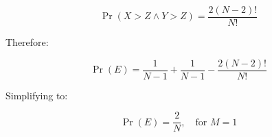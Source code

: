 \documentclass{article}
\theoremstyle{definition}
\begin{document}
\begin{appendices}
\begin{equation}
    \Pr(X>Z \wedge Y>Z)
    =
    \frac{2 (N-2)!}{N!}
\end{equation}

Therefore:

\begin{equation}
    \Pr(E) = \frac{1}{N-1} + \frac{1}{N-1} - \frac{2 (N-2)!}{N!}
\end{equation}

Simplifying to:

\begin{equation}
\boxed{
    \Pr(E) = \frac{2}{N}, \quad \text{for } M=1
    }
\end{equation}

\end{appendices}

\printbibliography
\end{document}
